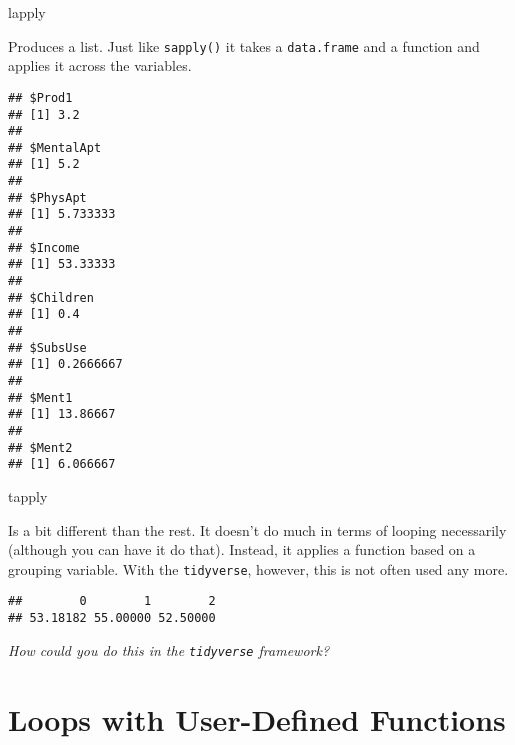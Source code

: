 \begin{frame}[fragile]{lapply}

Produces a list. Just like \texttt{sapply()} it takes a
\texttt{data.frame} and a function and applies it across the variables.

\begin{Shaded}
\begin{Highlighting}[]
\end{Highlighting}
\end{Shaded}

\begin{verbatim}
## $Prod1
## [1] 3.2
## 
## $MentalApt
## [1] 5.2
## 
## $PhysApt
## [1] 5.733333
## 
## $Income
## [1] 53.33333
## 
## $Children
## [1] 0.4
## 
## $SubsUse
## [1] 0.2666667
## 
## $Ment1
## [1] 13.86667
## 
## $Ment2
## [1] 6.066667
\end{verbatim}

\end{frame}

\begin{frame}[fragile]{tapply}

Is a bit different than the rest. It doesn't do much in terms of looping
necessarily (although you can have it do that). Instead, it applies a
function based on a grouping variable. With the \texttt{tidyverse},
however, this is not often used any more.

\begin{Shaded}
\begin{Highlighting}[]
\OperatorTok{$}\OperatorTok{$}
\end{Highlighting}
\end{Shaded}

\begin{verbatim}
##        0        1        2 
## 53.18182 55.00000 52.50000
\end{verbatim}

\emph{How could you do this in the \texttt{tidyverse} framework?}

\end{frame}

\section{Loops with User-Defined
Functions}\label{loops-with-user-defined-functions}

